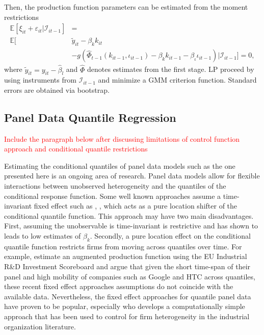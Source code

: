 \documentclass[11pt]{article}
\begin{document}
Then, the production function parameters can be estimated from the moment restrictions
\begin{equation}
\begin{split}
\mathbb{E}[\xi_{it}+\varepsilon_{it}|\mathcal{I}_{it-1}]&=\\
\mathbb{E}[&\tilde{y}_{it}-\beta_{k}k_{it}\\
&-g(\hat{\Phi}_{t-1}(k_{it-1}, \iota_{it-1})-\beta_{k}k_{it-1}-\beta_{\iota}\iota_{it-1})|\mathcal{I}_{it-1}]=0,
\end{split}
\end{equation}
where $\tilde{y}_{it}=y_{it}-\hat{\beta}_{l}$ and $\hat{\Phi}$ denotes estimates from the first stage. LP proceed by using instruments from $\mathcal{I}_{it-1}$ and minimize a GMM criterion function. Standard errors are obtained via bootstrap.

\subsection{Panel Data Quantile Regression}

\textcolor{red}{Include the paragraph below after discussing limitations of control function approach and conditional quantile restrictions}

Estimating the conditional quantiles of panel data models such as the one presented here is an ongoing area of research. Panel data models allow for flexible interactions between unobserved heterogeneity and the quantiles of the conditional response function. Some well known approaches assume a time-invariant fixed effect such as \cite{Koenker2004}, \cite{Lamarche2010}, \cite{Canay2011} which acts as a pure location shifter of the conditional quantile function. This approach may have two main disadvantages. First, assuming the unobservable is time-invariant is restrictive and \cite{Griliches1986} has shown to leads to low estimates of $\beta_{k}$. Secondly, a pure location effect on the conditional quantile function restricts firms from moving across quantiles over time. For example, \cite{Montresor2015} estimate an augmented production function using the EU Industrial R\&D Investment Scoreboard and argue that given the short time-span of their panel and high mobility of companies such as Google and HTC across quantiles, these recent fixed effect approaches assumptions do not coincide with the available data. Nevertheless, the fixed effect approaches for quantile panel data have proven to be popular, especially \cite{Canay2011} who develops a computationally simple approach that has been used to control for firm heterogeneity in the industrial organization literature.
\end{document}
